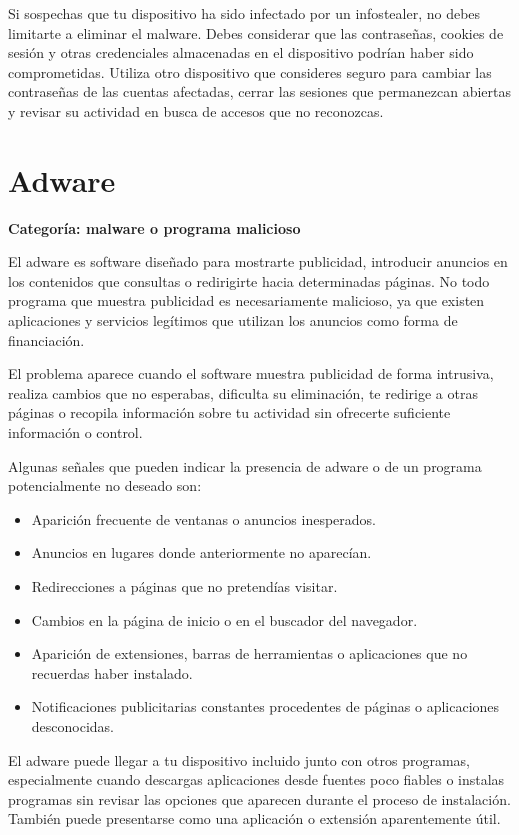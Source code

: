 \documentclass[
  spanish,
  a4paper,
  openany]{book}
\begin{document}
Si sospechas que tu dispositivo ha sido infectado por un infostealer, no debes limitarte a eliminar el malware. Debes considerar que las contraseñas, cookies de sesión y otras credenciales almacenadas en el dispositivo podrían haber sido comprometidas. Utiliza otro dispositivo que consideres seguro para cambiar las contraseñas de las cuentas afectadas, cerrar las sesiones que permanezcan abiertas y revisar su actividad en busca de accesos que no reconozcas.

\section{Adware}\label{adware}

\textbf{Categoría: malware o programa malicioso}

El adware es software diseñado para mostrarte publicidad, introducir anuncios en los contenidos que consultas o redirigirte hacia determinadas páginas. No todo programa que muestra publicidad es necesariamente malicioso, ya que existen aplicaciones y servicios legítimos que utilizan los anuncios como forma de financiación.

El problema aparece cuando el software muestra publicidad de forma intrusiva, realiza cambios que no esperabas, dificulta su eliminación, te redirige a otras páginas o recopila información sobre tu actividad sin ofrecerte suficiente información o control.

Algunas señales que pueden indicar la presencia de adware o de un programa potencialmente no deseado son:

\begin{itemize}
\item
  Aparición frecuente de ventanas o anuncios inesperados.
\item
  Anuncios en lugares donde anteriormente no aparecían.
\item
  Redirecciones a páginas que no pretendías visitar.
\item
  Cambios en la página de inicio o en el buscador del navegador.
\item
  Aparición de extensiones, barras de herramientas o aplicaciones que no recuerdas haber instalado.
\item
  Notificaciones publicitarias constantes procedentes de páginas o aplicaciones desconocidas.
\end{itemize}

El adware puede llegar a tu dispositivo incluido junto con otros programas, especialmente cuando descargas aplicaciones desde fuentes poco fiables o instalas programas sin revisar las opciones que aparecen durante el proceso de instalación. También puede presentarse como una aplicación o extensión aparentemente útil.
\end{document}
